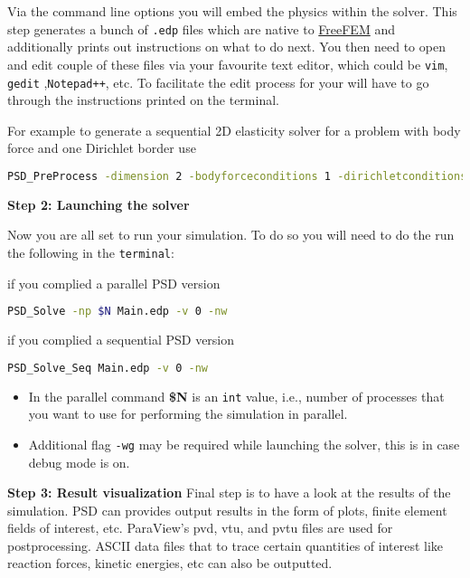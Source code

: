 Via the command line options you will embed the physics within the
solver. This step generates a bunch of \lstinline!.edp! files which are
native to \href{https://freefem.org/}{FreeFEM} and additionally prints
out instructions on what to do next. You then need to open and edit
couple of these files via your favourite text editor, which could be
\lstinline!vim!, \lstinline!gedit! ,\lstinline!Notepad++!, etc. To
facilitate the edit process for your will have to go through the
instructions printed on the terminal.

For example to generate a sequential 2D elasticity solver for a problem
with body force and one Dirichlet border use

\begin{lstlisting}[language=bash]
PSD_PreProcess -dimension 2 -bodyforceconditions 1 -dirichletconditions 1
\end{lstlisting}

\textbf{Step 2: Launching the solver}

Now you are all set to run your simulation. To do so you will need to do
the run the following in the \lstinline!terminal!:

if you complied a parallel PSD version

\begin{lstlisting}[language=bash]
PSD_Solve -np $N Main.edp -v 0 -nw
\end{lstlisting}

if you complied a sequential PSD version

\begin{lstlisting}[language=bash]
PSD_Solve_Seq Main.edp -v 0 -nw
\end{lstlisting}

\begin{itemize}
\item
  In the parallel command \textbf{\$N} is an \lstinline!int! value,
  i.e., number of processes that you want to use for performing the
  simulation in parallel.
\item
  Additional flag \lstinline!-wg! may be required while launching the
  solver, this is in case debug mode is on.
\end{itemize}

\textbf{Step 3: Result visualization} Final step is to have a look at
the results of the simulation. PSD can provides output results in the
form of plots, finite element fields of interest, etc. ParaView's pvd,
vtu, and pvtu files are used for postprocessing. ASCII data files that
to trace certain quantities of interest like reaction forces, kinetic
energies, etc can also be outputted.

